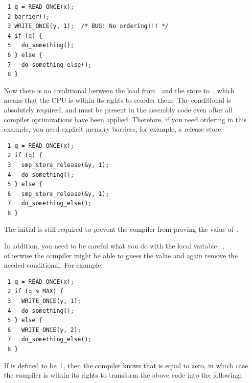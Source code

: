 \vspace{5pt}
\begin{minipage}[t]{\columnwidth}
\scriptsize
\begin{verbatim}
 1 q = READ_ONCE(x);
 2 barrier();
 3 WRITE_ONCE(y, 1);  /* BUG: No ordering!!! */
 4 if (q) {
 5   do_something();
 6 } else {
 7   do_something_else();
 8 }
\end{verbatim}
\end{minipage}
\vspace{5pt}

Now there is no conditional between the load from~ and the store
to~, which means that the CPU is within its rights to reorder them:
The conditional is absolutely required, and must be present in the
assembly code even after all compiler optimizations have been applied.
Therefore, if you need ordering in this example, you need explicit
memory barriers, for example, a release store:

\vspace{5pt}
\begin{minipage}[t]{\columnwidth}
\scriptsize
\begin{verbatim}
 1 q = READ_ONCE(x);
 2 if (q) {
 3   smp_store_release(&y, 1);
 4   do_something();
 5 } else {
 6   smp_store_release(&y, 1);
 7   do_something_else();
 8 }
\end{verbatim}
\end{minipage}
\vspace{5pt}

The initial  is still required to prevent the compiler from
proving the value of~.

In addition, you need to be careful what you do with the local variable~%
,
otherwise the compiler might be able to guess the value and again remove
the needed conditional.
For example:

\vspace{5pt}
\begin{minipage}[t]{\columnwidth}
\scriptsize
\begin{verbatim}
 1 q = READ_ONCE(x);
 2 if (q % MAX) {
 3   WRITE_ONCE(y, 1);
 4   do_something();
 5 } else {
 6   WRITE_ONCE(y, 2);
 7   do_something_else();
 8 }
\end{verbatim}
\end{minipage}
\vspace{5pt}

If  is defined to be~1, then the compiler knows that  is
equal to zero, in which case the compiler is within its rights to
transform the above code into the following:

